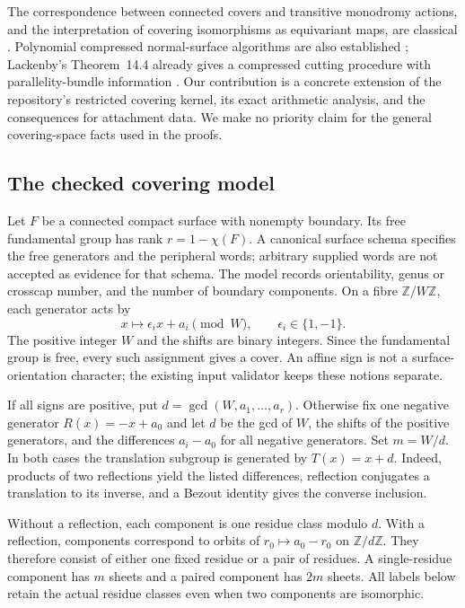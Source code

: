 \documentclass[11pt]{article}
\theoremstyle{definition}
\theoremstyle{remark}
\newcommand{\Z}{\mathbb Z}
\begin{document}
The correspondence between connected covers and transitive monodromy
actions, and the interpretation of covering isomorphisms as equivariant
maps, are classical \cite[Section 1.3]{hatcher-covering}.  Polynomial
compressed normal-surface algorithms are also established
\cite{aht-orbits}; Lackenby's Theorem~14.4 already gives a compressed
cutting procedure with parallelity-bundle information
\cite{lackenby2026}.  Our contribution is a concrete extension of the
repository's restricted covering kernel, its exact arithmetic analysis,
and the consequences for attachment data.  We make no priority claim for
the general covering-space facts used in the proofs.

\subsection{The checked covering model}

Let $F$ be a connected compact surface with nonempty boundary.  Its free
fundamental group has rank $r=1-\chi(F)$.  A canonical surface schema
specifies the free generators and the peripheral words; arbitrary supplied
words are not accepted as evidence for that schema.  The model records
orientability, genus or crosscap number, and the number of boundary
components.  On a fibre $\Z/W\Z$, each generator acts by
\[
 x\longmapsto \epsilon_i x+a_i\pmod W,
 \qquad \epsilon_i\in\{1,-1\}.
\]
The positive integer $W$ and the shifts are binary integers.  Since the
fundamental group is free, every such assignment gives a cover.  An affine
sign is not a surface-orientation character; the existing input validator
keeps these notions separate.

If all signs are positive, put $d=\gcd(W,a_1,\ldots,a_r)$.  Otherwise fix
one negative generator $R(x)=-x+a_0$ and let $d$ be the gcd of $W$, the
shifts of the positive generators, and the differences $a_i-a_0$ for all
negative generators.  Set $m=W/d$.  In both cases the translation subgroup
is generated by $T(x)=x+d$.  Indeed, products of two reflections yield the
listed differences, reflection conjugates a translation to its inverse,
and a Bezout identity gives the converse inclusion.

Without a reflection, each component is one residue class modulo $d$.
With a reflection, components correspond to orbits of
$r_0\mapsto a_0-r_0$ on $\Z/d\Z$.  They therefore consist of either one
fixed residue or a pair of residues.  A single-residue component has $m$
sheets and a paired component has $2m$ sheets.  All labels below retain
the actual residue classes even when two components are isomorphic.
\end{document}
